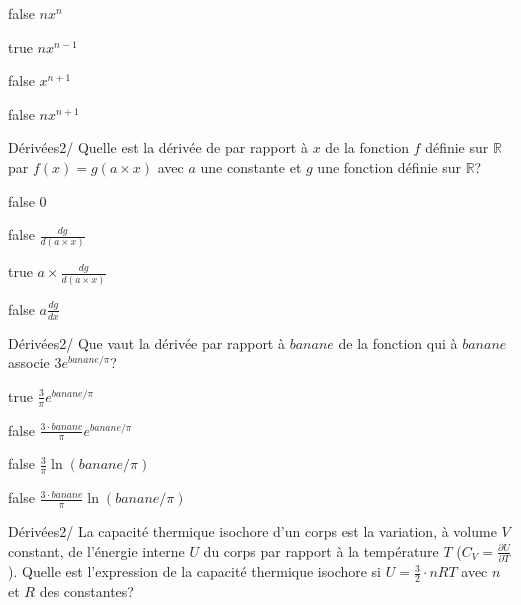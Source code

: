 \documentclass[11pt]{article}
\begin{document}
            \begin{reponses}
            	\item[false] $nx^n$
            	\item[true] $nx^{n-1}$
                \item[false] $x^{n+1}$
                \item[false] $nx^{n+1}$
            \end{reponses}
        
        	\begin{question}{22}{Dérivées}{2}{/}
				Quelle est la dérivée de par rapport à $x$ de la fonction $f$ définie sur $\mathbb{R}$ par $f(x)= g(a\times x)$ avec $a$ une constante et $g$ une fonction définie sur $\mathbb{R}$?
            \end{question}

            \begin{reponses}
            	\item[false] $0$
            	\item[false] $\frac{dg}{d(a\times x)}$
                \item[true] $a\times \frac{dg}{d(a\times x)}$
                \item[false] $a\frac{dg}{dx}$
            \end{reponses}

            \begin{question}{22}{Dérivées}{2}{/}
                Que vaut la dérivée par rapport à $banane$ de la fonction qui à $banane$ associe $3e^{banane/\pi}$?
            \end{question}

            \begin{reponses}
                \item[true] $\frac{3}{\pi}e^{banane/\pi}$
                \item[false] $\frac{3\cdot banane}{\pi}e^{banane/\pi}$
                \item[false] $\frac{3}{\pi}\ln(banane/\pi)$
                \item[false] $\frac{3\cdot banane}{\pi}\ln(banane/\pi)$
            \end{reponses}

            \begin{question}{22}{Dérivées}{2}{/}
                La capacité thermique isochore d'un corps est la variation, à volume $V$ constant, de l'énergie interne $U$ du corps par rapport à la température $T$ ($C_V=\frac{\partial U}{\partial T}$). Quelle est l'expression de la capacité thermique isochore si $U=\frac{3}{2}\cdot nRT$ avec $n$ et $R$ des constantes?
            \end{question}
\end{document}
